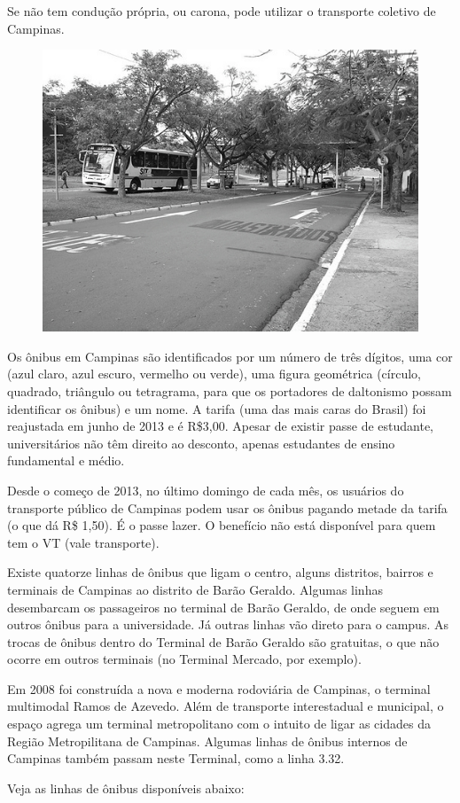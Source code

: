 Se não tem condução própria, ou carona, pode utilizar o transporte coletivo de
Campinas.

\begin{figure}[h!]
    \centering
    \includegraphics[width=.45\textwidth]{img/barao/onibus.jpg}
\end{figure}

Os ônibus em Campinas são identificados por um número de três dígitos, uma cor
(azul claro, azul escuro, vermelho ou verde), uma figura geométrica (círculo,
quadrado, triângulo ou tetragrama, para que os portadores de daltonismo possam
identificar os ônibus) e um nome. A tarifa (uma das mais caras do Brasil) foi
reajustada em junho de 2013 e é R\$3,00. Apesar de existir passe de estudante,
universitários não têm direito ao desconto, apenas estudantes de ensino
fundamental e médio.

Desde o começo de 2013, no último domingo de cada mês, os usuários do transporte 
público de Campinas podem usar os ônibus pagando metade da tarifa (o que dá R\$ 1,50). 
É o passe lazer. O benefício não está disponível para quem tem o VT (vale transporte).

Existe quatorze linhas de ônibus que ligam o centro, alguns distritos, bairros e
terminais de Campinas ao distrito de Barão Geraldo. Algumas linhas desembarcam
os passageiros no terminal de Barão Geraldo, de onde seguem em outros ônibus
para a universidade. Já outras linhas vão direto para o campus. As trocas de
ônibus dentro do Terminal de Barão Geraldo são gratuitas, o que não ocorre em
outros terminais (no Terminal Mercado, por exemplo).

Em 2008 foi construída a nova e moderna rodoviária de Campinas, o terminal
multimodal Ramos de Azevedo. Além de transporte interestadual e municipal, o
espaço agrega um terminal metropolitano com o intuito de ligar as cidades da
Região Metropilitana de Campinas. Algumas linhas de ônibus internos de Campinas
também passam neste Terminal, como a linha 3.32.

Veja as linhas de ônibus disponíveis abaixo:

